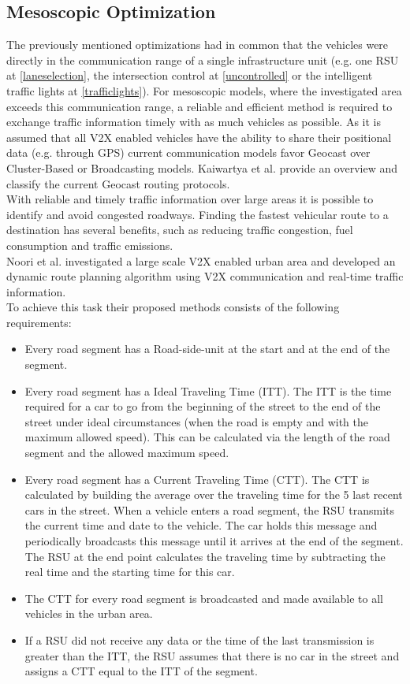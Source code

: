 \documentclass{sig-alternate}
\begin{document}
\subsection{Mesoscopic Optimization}
The previously mentioned optimizations had in common that the vehicles were directly in the communication range of a single infrastructure unit (e.g. one RSU at \ref{laneselection}, the intersection control at \ref{uncontrolled} or the intelligent traffic lights at \ref{trafficlights}). For mesoscopic models, where the investigated area exceeds this communication range, a reliable and efficient method is required to exchange traffic information timely with as much vehicles as possible. As it is assumed that all V2X enabled vehicles have the ability to share their positional data (e.g. through GPS) current communication models favor Geocast over Cluster-Based or Broadcasting models. Kaiwartya et al.\cite{6776965} provide an overview and classify the current Geocast routing protocols. \\  
With reliable and timely traffic information over large areas it is possible to identify and avoid congested roadways. Finding the fastest vehicular route to a destination has several benefits, such as reducing traffic congestion, fuel consumption and traffic emissions.\\
Noori et al.\cite{6799873} investigated a large scale V2X enabled urban area and developed an dynamic route planning algorithm using V2X communication and real-time traffic information. \\
To achieve this task their proposed methods consists of the following requirements:
\begin{itemize}
\item Every road segment has a Road-side-unit at the start and at the end of the segment. 
\item Every road segment has a Ideal Traveling Time (ITT). The ITT is the time required for a car to go from the beginning of the street to the end of the street under ideal circumstances (when the road is empty and with the maximum allowed speed). This can be calculated via the length of the road segment and the allowed maximum speed. 
\item Every road segment has a Current Traveling Time (CTT). The CTT is calculated by building the average over the traveling time for the 5 last recent cars in the street. When a vehicle enters a road segment, the RSU transmits the current time and date to the vehicle. The car holds this message and periodically broadcasts this message until it arrives at the end of the segment. The RSU at the end point calculates the traveling time by subtracting the real time and the starting time for this car. 
\item The CTT for every road segment is broadcasted and made available to all vehicles in the urban area. 
\item If a RSU did not receive any data or the time of the last transmission is greater than the ITT, the RSU assumes that there is no car in the street and assigns a CTT equal to the ITT of the segment.
\end{itemize}
\end{document}
